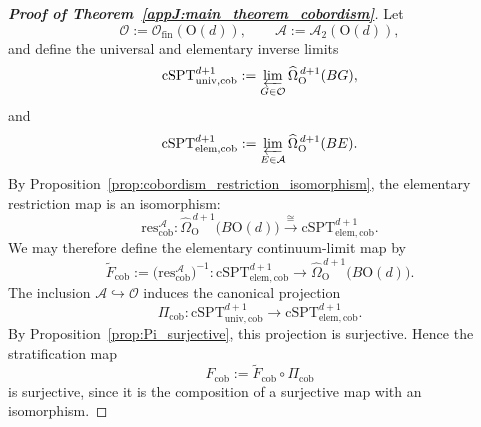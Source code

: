 \documentclass[aps,prx,reprint,superscriptaddress,twocolumn,amsmath,amssymb,amsfonts, nofootinbib]{revtex4-2}
\newcommand{\res}{\text{res}}
\theoremstyle{apsstyle}
\begin{document}
\begin{proof}[
\textnormal{\textbf{Proof of
Theorem~\ref{appJ:main_theorem_cobordism}}}]
Let
\begin{equation*}
    \mathcal O
    :=
    \mathcal O_{\mathrm{fin}}(\mathrm O(d)),
    \qquad
    \mathcal A
    :=
    \mathcal A_2(\mathrm O(d)),
\end{equation*}
and define the universal and elementary inverse limits
\begin{equation*}
    \mathrm{cSPT}_{\mathrm{univ},\mathrm{cob}}^{d+1}
    :=
    \varprojlim_{G\in\mathcal O}
    \widehat{\Omega}_{\mathrm O}^{\,d+1}(BG),
\end{equation*}
and
\begin{equation*}
    \mathrm{cSPT}_{\mathrm{elem},\mathrm{cob}}^{d+1}
    :=
    \varprojlim_{E\in\mathcal A}
    \widehat{\Omega}_{\mathrm O}^{\,d+1}(BE).
\end{equation*}
By Proposition~\ref{prop:cobordism_restriction_isomorphism}, the
elementary restriction map is an isomorphism:
\begin{equation*}
    \res_{\mathrm{cob}}^{\mathcal A}:
    \widehat{\Omega}_{\mathrm O}^{\,d+1}
    \bigl(B\mathrm O(d)\bigr)
    \xrightarrow{\;\cong\;}
    \mathrm{cSPT}_{\mathrm{elem},\mathrm{cob}}^{d+1}.
\end{equation*}
We may therefore define the elementary continuum-limit map by
\begin{equation*}
    \widetilde F_{\mathrm{cob}}
    :=
    \bigl(\res_{\mathrm{cob}}^{\mathcal A}\bigr)^{-1}:
    \mathrm{cSPT}_{\mathrm{elem},\mathrm{cob}}^{d+1}
    \longrightarrow
    \widehat{\Omega}_{\mathrm O}^{\,d+1}
    \bigl(B\mathrm O(d)\bigr).
\end{equation*}
The inclusion
$\mathcal A\hookrightarrow\mathcal O$ induces the canonical projection
\begin{equation*}
    \Pi_{\mathrm{cob}}:
    \mathrm{cSPT}_{\mathrm{univ},\mathrm{cob}}^{d+1}
    \longrightarrow
    \mathrm{cSPT}_{\mathrm{elem},\mathrm{cob}}^{d+1}.
\end{equation*}
By Proposition~\ref{prop:Pi_surjective}, this projection is
surjective. Hence the stratification map
\begin{equation*}
    F_{\mathrm{cob}}
    :=
    \widetilde F_{\mathrm{cob}}
    \circ
    \Pi_{\mathrm{cob}}
\end{equation*}
is surjective, since it is the composition of a surjective map with
an isomorphism.
\end{proof}
\end{document}

